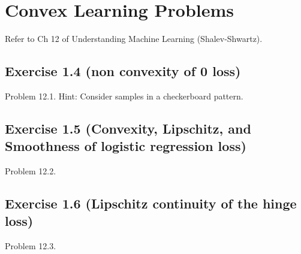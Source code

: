 \documentclass[
  10pt, %
  a4paper, %
  oneside, %
  headinclude,footinclude, %
  BCOR5mm, %
]{scrartcl}
\begin{document}
\section{Convex Learning Problems}
Refer to Ch 12 of Understanding Machine Learning (Shalev-Shwartz).

\subsection*{Exercise 1.4 (non convexity of 0 loss)}
Problem 12.1. Hint: Consider samples in a checkerboard pattern.

\subsection*{Exercise 1.5 (Convexity, Lipschitz, and Smoothness of logistic regression loss)}
Problem 12.2.

\subsection*{Exercise 1.6 (Lipschitz continuity of the hinge loss)}
Problem 12.3.


\end{document}
